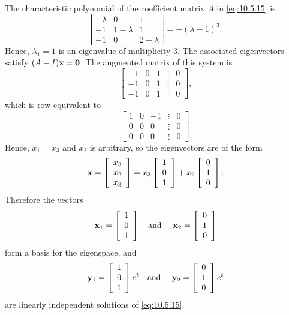 \begin{examplesolution}
\solution The characteristic polynomial of the coefficient matrix $A$ in \eqref{eq:10.5.15} is
\[
  \left|
  \begin{array}{ccc}
    -\lambda & 0         & 1         \\
    -1       & 1-\lambda & 1         \\
    -1       & 0         & 2-\lambda
  \end{array}\right|=-(\lambda-1)^{3}.
\]
Hence, $\lambda_{1}=1$ is an eigenvalue of multiplicity $3$. The associated eigenvectors satisfy
$(A-I){\bf x}={\bf 0}$. The augmented matrix of this system is
\[
  \left[
  \begin{array}{rrrcr}
    -1 & 0 & 1 & \vdots & 0 \\
    -1 & 0 & 1 & \vdots & 0 \\
    -1 & 0 & 1 & \vdots & 0
  \end{array}\right],
\]
which is row equivalent to
\[
  \left[
  \begin{array}{rrrcr}
    1 & 0 & -1 & \vdots & 0 \\
    0 & 0 & 0  & \vdots & 0 \\
    0 & 0 & 0  & \vdots & 0
  \end{array}\right].
\]
Hence, $x_{1}=x_{3}$ and $x_{2}$ is arbitrary, so the eigenvectors are of the form
\[
  {\bf x}=\left[\begin{array}{r}x_{3}\\x_{2}\\x_{3}\end{array}\right]=x_{3}\left[\begin{array}{r}1\\0\\1\end{array}\right]+x_{2}\left[\begin{array}{r}0\\1\\0\end{array}\right].
\]
Therefore the vectors
\begin{equation}
  \label{eq:10.5.16}{\bf x}_{1}=\left[\begin{array}{r}1\\0\\1\end{array}\right]\quad\mbox{and }\quad{\bf x}_{2}=\left[\begin{array}{r}0\\1\\0\end{array}\right]
\end{equation}
form a basis for the eigenspace, and
\[
  {\bf y}_{1}=\left[\begin{array}{r}1\\0\\1\end{array}\right]e^{t}\quad\mbox{and }\quad{\bf y}_{2}=\left[\begin{array}{r}0\\1\\0\end{array}\right]e^{t}
\]
are linearly independent solutions of \eqref{eq:10.5.15}.


\end{examplesolution}
